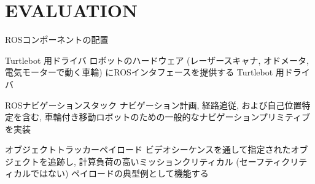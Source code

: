 
\section{EVALUATION}
\label{sec: evaluation}




\begin{frame}{ROSコンポーネントの配置}
    \begin{block}{Turtlebot 用ドライバ}
        ロボットのハードウェア (レーザースキャナ, オドメータ, 電気モーターで動く車輪) にROSインタフェースを提供する Turtlebot 用ドライバ
    \end{block}
    \begin{block}{ROSナビゲーションスタック}
        ナビゲーション計画, 経路追従, および自己位置特定を含む, 車輪付き移動ロボットのための一般的なナビゲーションプリミティブを実装
    \end{block}
    \begin{block}{オブジェクトトラッカーペイロード}
        ビデオシーケンスを通して指定されたオブジェクトを追跡し, 計算負荷の高いミッションクリティカル (セーフティクリティカルではない) ペイロードの典型例として機能する
    \end{block}
\end{frame}

